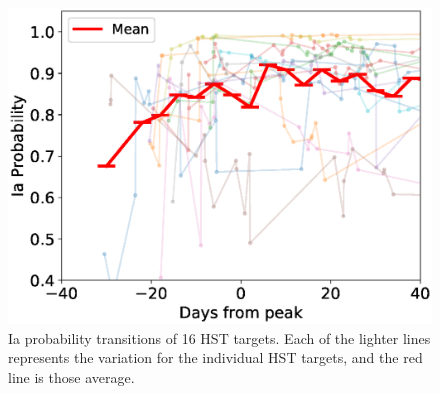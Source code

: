 \documentclass[useamsfonts]{pasj01}
\begin{document}
%
%
\begin{figure}[ht]
  \begin{center}
     \includegraphics[width=\columnwidth]{figures/HST_DaysFromPeak_vs_IaProbability_200108.eps}
  \end{center}
  \caption{%
  Ia probability transitions of 16 HST targets. Each of the lighter lines represents the variation for the individual HST targets, and the red line is those average.
  }%
  \label{fig:HSTIaprob}
\end{figure}
%
%
\end{document}
